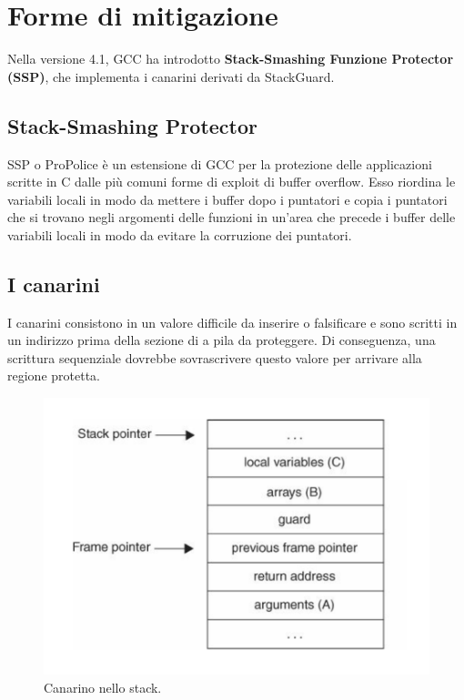 \newpage
\section{Forme di mitigazione}

Nella versione 4.1, GCC ha introdotto \textbf{Stack-Smashing Funzione Protector (SSP)},
che implementa i canarini derivati da StackGuard.

\subsection{Stack-Smashing Protector}

SSP o ProPolice è un estensione di GCC per la protezione delle applicazioni scritte
in C dalle più comuni forme di exploit di buffer overflow. Esso riordina le variabili
locali in modo da mettere i buffer dopo i puntatori e copia i puntatori che si trovano
negli argomenti delle funzioni in un'area che precede i buffer delle variabili locali
in modo da evitare la corruzione dei puntatori.

\subsection{I canarini}

I canarini consistono in un valore difficile da inserire o falsificare e sono scritti
in un indirizzo prima della sezione di a pila da proteggere.
Di conseguenza, una scrittura sequenziale dovrebbe sovrascrivere questo valore per
arrivare alla regione protetta.

\begin{figure}[H]
    \centering
    \includegraphics[width=12cm, keepaspectratio]{capitoli/secure_coding/img/cap_3/canarini.png}
    \caption{Canarino nello stack.}\label{fig:canarini}
\end{figure}

